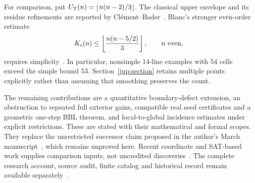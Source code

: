 For comparison, put $U_{\mathrm T}(n)=\left\lfloor n(n-2)/3\right\rfloor$. The classical upper envelope and its residue refinements are reported by Cl\'ement--Bader~\cite{clementbader2007}. Blanc's stronger even-order estimate
\begin{equation}\label{j:blanc}
 K_{\mathrm s}(n)\le\left\lfloor\frac{n(n-5/2)}3\right\rfloor,\qquad n\ \text{even},
\end{equation}
requires simplicity~\cite{blanc2011}. In particular, nonsimple $14$-line examples with $54$ cells exceed the simple bound $53$. Section~\ref{jup:section} retains multiple points explicitly rather than assuming that smoothing preserves the count.

The remaining contributions are a quantitative boundary-defect extension, an obstruction to repeated full exterior gains, compatible real seed certificates and a geometric one-step BBL theorem, and local-to-global incidence estimates under explicit restrictions. These are stated with their mathematical and formal scopes. They replace the unrestricted successor claim proposed in the author's March manuscript~\cite{zarzuelo2026}, which remains unproved here. Recent coordinate and SAT-based work supplies comparison inputs, not uncredited discoveries~\cite{savchuk2025,maiorana2026,parpalakutkinGallery2026}. The complete research account, source audit, finite catalog and historical record remain available separately~\cite{zarzueloFull2026}.
